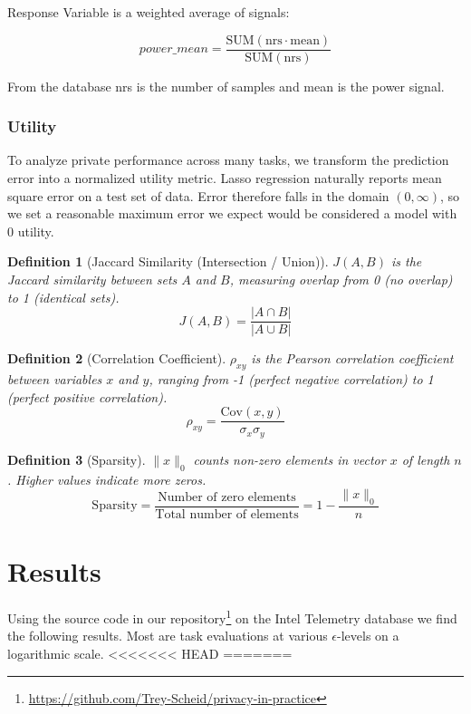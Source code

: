 \documentclass[12pt,letterpaper]{article}
\newtheorem{definition}{Definition}
\begin{document}
Response Variable is a weighted average of signals:

\[power\_mean = \frac{\text{SUM}(\text{nrs} \cdot \text{mean})}{\text{SUM}(\text{nrs})}\]

From the database nrs is the number of samples and mean is the power signal. 

\subsubsection{Utility}

To analyze private performance across many tasks, we transform the prediction error into a normalized utility metric. Lasso regression naturally reports mean square error on a test set of data. Error therefore falls in the domain $(0, \infty)$, so we set a reasonable maximum error we expect would be considered a model with 0 utility. 

\begin{definition}[Jaccard Similarity (Intersection / Union)]
    \label{def:sim}
    $J(A, B)$ is the Jaccard similarity between sets $A$ and $B$, measuring overlap from 0 (no overlap) to 1 (identical sets).
    \[J(A, B) = \frac{|A \cap B|}{|A \cup B|} \]
\end{definition}

\begin{definition}[Correlation Coefficient]
    \label{def:r2}
    $\rho_{xy}$ is the Pearson correlation coefficient between variables $x$ and $y$, ranging from -1 (perfect negative correlation) to 1 (perfect positive correlation).
    \[\rho_{xy} = \frac{\text{Cov}(x,y)}{\sigma_x \sigma_y}\]
\end{definition}

\begin{definition}[Sparsity]
    \label{def:sparsity}
    $\|x\|_0$ counts non-zero elements in vector $x$ of length $n$. Higher values indicate more zeros.
    \[\text{Sparsity} = \frac{\text{Number of zero elements}}{\text{Total number of elements}} = 1 - \frac{\|x\|_0}{n}\]
\end{definition}


\section{Results}

Using the source code in our repository\footnote{\url{https://github.com/Trey-Scheid/privacy-in-practice}} on the Intel Telemetry database we find the following results. Most are task evaluations at various $\epsilon$-levels on a logarithmic scale.
<<<<<<< HEAD
=======
\end{document}
